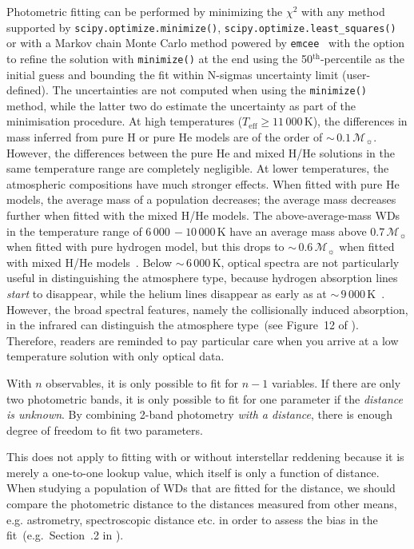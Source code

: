 \documentclass[fleqn,usenatbib]{rasti}
\newcommand{\msun}{\mathcal{M}_{\sun}}
\begin{document}
Photometric fitting can be performed by minimizing the $\chi^2$ with any method
supported by \texttt{scipy.optimize.minimize()},
\texttt{scipy.optimize.least\_squares()} or with a Markov chain Monte
Carlo method powered by \texttt{emcee}~\citep{2013PASP..125..306F} with the
option to refine the solution with \texttt{minimize()} at the end using the
50$^{\mathrm{th}}$-percentile as the initial guess and bounding the fit
within N-sigmas uncertainty limit (user-defined). The
uncertainties are not computed when using the {\texttt{minimize()}} method, while
the latter two do estimate the uncertainty as part of the minimisation
procedure. At high temperatures ($T_{\mathrm{eff}} \geq 11\,000$\,K), the
differences in mass inferred from pure H or pure He models are of the order
of $\sim$\,$0.1\,\msun$. However, the differences between the pure He and
mixed H/He solutions in the same temperature range are completely negligible.
At lower temperatures, the atmospheric compositions have much stronger effects.
When fitted with pure He models, the average mass of a population decreases;
the average mass decreases further when fitted with the mixed H/He models. The
above-average-mass WDs in the temperature range of $6\,000\,-10\,000$\,K
have an average mass above $0.7\,\msun$ when fitted with pure hydrogen model,
but this drops to $\sim$\,$0.6\,\msun$ when fitted with mixed
H/He models~\citep{2019ApJ...876...67B}. Below $\sim$\,$6\,000$\,K, optical
spectra are not particularly useful in distinguishing the atmosphere
type, because hydrogen absorption lines \textit{start} to disappear, while the
helium lines disappear
as early as at $\sim$\,$9\,000$\,K~\citep{2018ApJ...857...56R}. However, the
broad spectral features, namely the collisionally induced absorption, in the
infrared can distinguish the atmosphere type~(see Figure~12 of
\citealt{2017ApJ...848...36B}). Therefore, readers are reminded to pay
particular care when you arrive at a low temperature solution with only
optical data.

With $n$ observables, it is only possible to fit for $n-1$ variables. If there
are only two photometric bands, it is only possible to fit
for one parameter if the \textit{distance is unknown}. By combining 2-band
photometry \textit{with a distance}, there is enough degree of freedom to fit two
parameters.

This does not apply to fitting with or without interstellar reddening because
it is merely a one-to-one lookup value, which itself is
only a function of distance. When studying a population of WDs that are fitted
for the distance, we should compare the photometric distance to the distances
measured from other means, e.g. astrometry, spectroscopic distance etc. in order
to assess the bias in the fit~(e.g.\ Section~.2
in \citealt{2011MNRAS.417...93R}).
\end{document}
